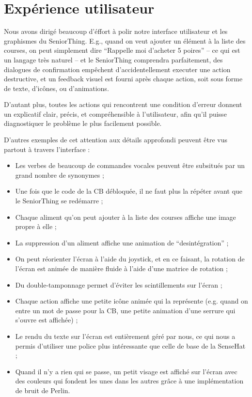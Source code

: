 \documentclass[11pt]{scrartcl} %
\begin{document}
\section{Expérience utilisateur}

Nous avons dirigé beaucoup d'éffort à polir notre interface utilisateur et les graphismes du SeniorThing.
E.g., quand on veut ajouter un élément à la liste des courses, on peut simplement dire ``Rappelle moi d'acheter 5 poires'' -- ce qui est un langage très naturel -- et le SeniorThing comprendra parfaitement, des dialogues de confirmation empêchent d'accidentellement executer une action destructive, et un feedback visuel est fourni après chaque action, soit sous forme de texte, d'icônes, ou d'animations.

D'autant plus, toutes les actions qui rencontrent une condition d'erreur donnent un explicatif clair, précis, et compréhensible à l'utilisateur, afin qu'il puisse diagnostiquer le problème le plus facilement possible.

D'autres exemples de cet attention aux détails approfondi peuvent être vus partout à travers l'interface :

\begin{itemize}
    \item Les verbes de beaucoup de commandes vocales peuvent être subsitués par un grand nombre de synonymes ;
    \item Une fois que le code de la CB débloquée, il ne faut plus la répéter avant que le SeniorThing se redémarre ;
    \item Chaque aliment qu'on peut ajouter à la liste des courses affiche une image propre à elle ;
    \item La suppression d'un aliment affiche une animation de ``desintégration'' ;
    \item On peut réorienter l'écran à l'aide du joystick, et en ce faisant, la rotation de l'écran est animée de manière fluide à l'aide d'une matrice de rotation ;
    \item Du double-tamponnage permet d'éviter les scintillements sur l'écran ;
    \item Chaque action affiche une petite icône animée qui la représente (e.g. quand on entre un mot de passe pour la CB, une petite animation d'une serrure qui s'ouvre est affichée) ;
    \item Le rendu du texte sur l'écran est entièrement géré par nous, ce qui nous a permis d'utiliser une police plus intéressante que celle de base de la SenseHat ;
    \item Quand il n'y a rien qui se passe, un petit visage est affiché sur l'écran avec des couleurs qui fondent les unes dans les autres grâce à une implémentation de bruit de Perlin.
\end{itemize}
\end{document}

